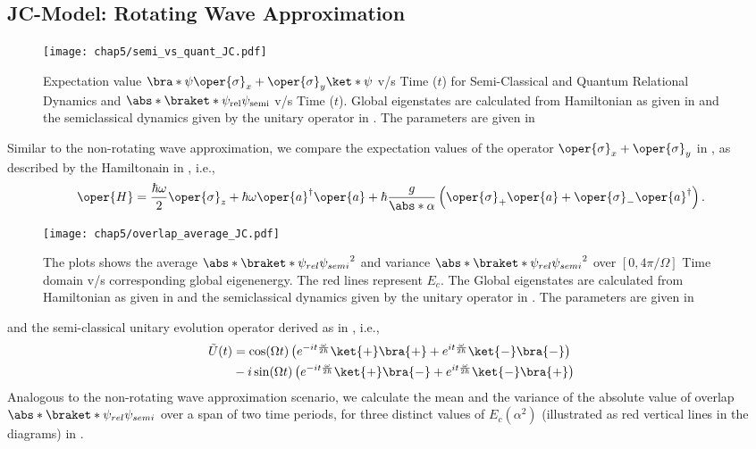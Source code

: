 \subsection*{JC-Model: Rotating Wave Approximation}
\begin{figure}[!h]
    \centering
    \texttt{[image: chap5/semi\_vs\_quant\_JC.pdf]}
    \caption{
    Expectation value
        \(\bra*{\psi} \oper{\sigma}_x + \oper{\sigma}_y \ket*{\psi}\) v/s Time ($t$) for Semi-Classical and Quantum Relational Dynamics
    and \(\abs*{\braket*{\psi_{\mathrm{rel}}}{\psi_{\mathrm{semi}}}}\) v/s Time ($t$). Global eigenstates are calculated from Hamiltonian as given in  and the semiclassical dynamics given by the unitary operator in . The parameters 
    are given in 
    }
    \label{fig:chap5_JCM_semi_vs_quant}
\end{figure}
Similar to the non-rotating wave approximation, we compare the expectation values of the operator
\(\oper{\sigma}_x + \oper{\sigma}_y\) in , as described by the Hamiltonain in , i.e., 
\begin{eqnarray}
\label{eq:chap5_JC_rotwave_hamiltonian}
    \oper{H} = \frac{\hbar \omega}{2} \oper{\sigma}_z + \hbar \omega\oper{a}^\dagger \oper{a}
    + \hbar \frac{g}{\abs*{\alpha}} \left(\oper{\sigma}_+ \oper{a} + \oper{\sigma}_- \oper{a}^\dagger\right).
\end{eqnarray}
\begin{figure}[!ht]
    \centering
    \texttt{[image: chap5/overlap\_average\_JC.pdf]}
    \caption{The plots shows the average $\abs*{\braket*{\psi_{rel}}{\psi_{semi}}}^2$ and 
     variance $\abs*{\braket*{\psi_{rel}}{\psi_{semi}}}^2$ over \([0, 4\pi/\Omega]\) Time domain v/s corresponding global eigenenergy. The red lines represent \(E_c\).
     The Global eigenstates are calculated from Hamiltonian as given in  and the semiclassical dynamics given by the unitary operator in . The parameters 
    are given in  }
     \label{fig:chap5_JCM_overlap_avg}
\end{figure}
and the semi-classical unitary evolution operator derived as in , i.e.,
\begin{eqnarray}
\label{eq:chap5_JC_rotwave_unitary_semi}
    \tilde{U}(t) 
    &= \cos(\Omega t) \left(e^{-i t \frac{\omega}{2\hbar}}\ket{+}\bra{+} + 
    e^{i t \frac{\omega}{2\hbar}}\ket{-}\bra{-} \right)  \nonumber \\
    &- i \sin(\Omega t)
     \left( e^{-i t \frac{\omega}{2\hbar}}\ket{+}\bra{-}
    + e^{i t \frac{\omega}{2\hbar}}\ket{-}\bra{+}\right) 
\end{eqnarray}
Analogous to the non-rotating wave approximation scenario, we calculate the mean and the variance of the absolute value of overlap \(\abs*{\braket*{\psi_{rel}}{\psi_{semi}}}\) over a span of two time periods, for three distinct values of \(E_c(\alpha^2)\) (illustrated as red vertical lines in the diagrams) in .

